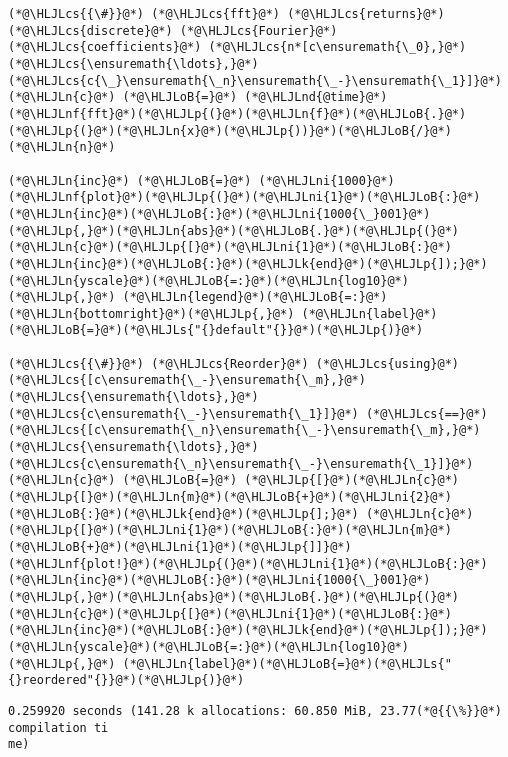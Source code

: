 \documentclass[12pt,landscape]{article}
\newcommand{\HLJLk}[1]{\textcolor[RGB]{148,91,176}{\textbf{#1}}}
\newcommand{\HLJLn}[1]{#1}
\newcommand{\HLJLnd}[1]{\textcolor[RGB]{214,102,97}{#1}}
\newcommand{\HLJLnf}[1]{\textcolor[RGB]{66,102,213}{#1}}
\newcommand{\HLJLs}[1]{\textcolor[RGB]{201,61,57}{#1}}
\newcommand{\HLJLni}[1]{\textcolor[RGB]{59,151,46}{#1}}
\newcommand{\HLJLoB}[1]{\textcolor[RGB]{102,102,102}{\textbf{#1}}}
\newcommand{\HLJLp}[1]{#1}
\newcommand{\HLJLcs}[1]{\textcolor[RGB]{153,153,119}{\textit{#1}}}
\begin{document}
{\begin{lstlisting}
(*@\HLJLcs{{\#}}@*) (*@\HLJLcs{fft}@*) (*@\HLJLcs{returns}@*) (*@\HLJLcs{discrete}@*) (*@\HLJLcs{Fourier}@*) (*@\HLJLcs{coefficients}@*) (*@\HLJLcs{n*[c\ensuremath{\_0},}@*) (*@\HLJLcs{\ensuremath{\ldots},}@*) (*@\HLJLcs{c{\_}\ensuremath{\_n}\ensuremath{\_-}\ensuremath{\_1}]}@*)
(*@\HLJLn{c}@*) (*@\HLJLoB{=}@*) (*@\HLJLnd{@time}@*) (*@\HLJLnf{fft}@*)(*@\HLJLp{(}@*)(*@\HLJLn{f}@*)(*@\HLJLoB{.}@*)(*@\HLJLp{(}@*)(*@\HLJLn{x}@*)(*@\HLJLp{))}@*)(*@\HLJLoB{/}@*)(*@\HLJLn{n}@*)

(*@\HLJLn{inc}@*) (*@\HLJLoB{=}@*) (*@\HLJLni{1000}@*)
(*@\HLJLnf{plot}@*)(*@\HLJLp{(}@*)(*@\HLJLni{1}@*)(*@\HLJLoB{:}@*)(*@\HLJLn{inc}@*)(*@\HLJLoB{:}@*)(*@\HLJLni{1000{\_}001}@*)(*@\HLJLp{,}@*)(*@\HLJLn{abs}@*)(*@\HLJLoB{.}@*)(*@\HLJLp{(}@*)(*@\HLJLn{c}@*)(*@\HLJLp{[}@*)(*@\HLJLni{1}@*)(*@\HLJLoB{:}@*)(*@\HLJLn{inc}@*)(*@\HLJLoB{:}@*)(*@\HLJLk{end}@*)(*@\HLJLp{]);}@*) (*@\HLJLn{yscale}@*)(*@\HLJLoB{=:}@*)(*@\HLJLn{log10}@*)(*@\HLJLp{,}@*) (*@\HLJLn{legend}@*)(*@\HLJLoB{=:}@*)(*@\HLJLn{bottomright}@*)(*@\HLJLp{,}@*) (*@\HLJLn{label}@*)(*@\HLJLoB{=}@*)(*@\HLJLs{"{}default"{}}@*)(*@\HLJLp{)}@*)

(*@\HLJLcs{{\#}}@*) (*@\HLJLcs{Reorder}@*) (*@\HLJLcs{using}@*) (*@\HLJLcs{[c\ensuremath{\_-}\ensuremath{\_m},}@*) (*@\HLJLcs{\ensuremath{\ldots},}@*) (*@\HLJLcs{c\ensuremath{\_-}\ensuremath{\_1}]}@*) (*@\HLJLcs{==}@*) (*@\HLJLcs{[c\ensuremath{\_n}\ensuremath{\_-}\ensuremath{\_m},}@*) (*@\HLJLcs{\ensuremath{\ldots},}@*) (*@\HLJLcs{c\ensuremath{\_n}\ensuremath{\_-}\ensuremath{\_1}]}@*)
(*@\HLJLn{c}@*) (*@\HLJLoB{=}@*) (*@\HLJLp{[}@*)(*@\HLJLn{c}@*)(*@\HLJLp{[}@*)(*@\HLJLn{m}@*)(*@\HLJLoB{+}@*)(*@\HLJLni{2}@*)(*@\HLJLoB{:}@*)(*@\HLJLk{end}@*)(*@\HLJLp{];}@*) (*@\HLJLn{c}@*)(*@\HLJLp{[}@*)(*@\HLJLni{1}@*)(*@\HLJLoB{:}@*)(*@\HLJLn{m}@*)(*@\HLJLoB{+}@*)(*@\HLJLni{1}@*)(*@\HLJLp{]]}@*)
(*@\HLJLnf{plot!}@*)(*@\HLJLp{(}@*)(*@\HLJLni{1}@*)(*@\HLJLoB{:}@*)(*@\HLJLn{inc}@*)(*@\HLJLoB{:}@*)(*@\HLJLni{1000{\_}001}@*)(*@\HLJLp{,}@*)(*@\HLJLn{abs}@*)(*@\HLJLoB{.}@*)(*@\HLJLp{(}@*)(*@\HLJLn{c}@*)(*@\HLJLp{[}@*)(*@\HLJLni{1}@*)(*@\HLJLoB{:}@*)(*@\HLJLn{inc}@*)(*@\HLJLoB{:}@*)(*@\HLJLk{end}@*)(*@\HLJLp{]);}@*) (*@\HLJLn{yscale}@*)(*@\HLJLoB{=:}@*)(*@\HLJLn{log10}@*)(*@\HLJLp{,}@*) (*@\HLJLn{label}@*)(*@\HLJLoB{=}@*)(*@\HLJLs{"{}reordered"{}}@*)(*@\HLJLp{)}@*)
\end{lstlisting}

\begin{lstlisting}
0.259920 seconds (141.28 k allocations: 60.850 MiB, 23.77(*@{{\%}}@*) compilation ti
me)
\end{lstlisting}

}
\end{document}
